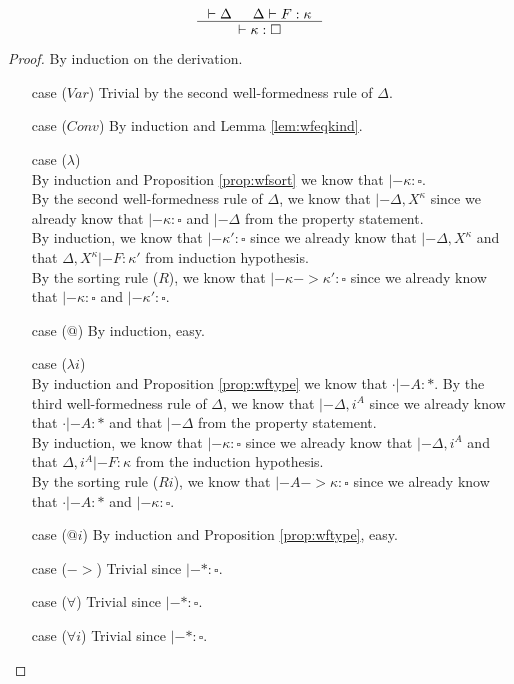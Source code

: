 \begin{proposition}
\label{prop:wfkind}
\[ \inference{ |- \Delta & \Delta |- F : \kappa}{ |- \kappa:\square }
\]
\end{proposition}
\begin{proof} By induction on the derivation.
\begin{itemize}
\item[case] ($Var$)
	Trivial by the second well-formedness rule of $\Delta$.
\item[case] ($Conv$)
	By induction and Lemma \ref{lem:wfeqkind}.
\item[case] ($\lambda$) \\
	By induction and Proposition \ref{prop:wfsort} we know
	that $|- \kappa:\square$.\\
	By the second well-formedness rule of $\Delta$,
	we know that $|- \Delta,X^\kappa$ since we already know
	that $|- \kappa:\square$ and $|- \Delta$ from the property statement.\\
	By induction, we know that $|- \kappa':\square$
	since we already know that $|- \Delta,X^\kappa$ and
	that $\Delta,X^\kappa|- F:\kappa'$ from induction hypothesis.\\
	By the sorting rule ($R$), we know that $|- \kappa -> \kappa':\square$
	since we already know that $|- \kappa:\square$ and $|- \kappa':\square$.
\item[case] ($@$)
	By induction, easy.
\item[case] ($\lambda i$)\\
	By induction and Proposition \ref{prop:wftype} we know
	that $\cdot|- A:*$.
	By the third well-formedness rule of $\Delta$,
	we know that $|- \Delta,i^A$ since we already know that $\cdot|- A:*$ and
	that $|- \Delta$ from the property statement.\\
	By induction, we know that $|- \kappa:\square$
	since we already know that $|- \Delta,i^A$ and
	that $\Delta,i^A|- F:\kappa$ from the induction hypothesis.\\
	By the sorting rule ($Ri$), we know that $|- A -> \kappa:\square$
	since we already know that $\cdot |- A:*$ and $|- \kappa:\square$.
\item[case] ($@i$)
	By induction and Proposition \ref{prop:wftype}, easy.
\item[case] ($->$)
	Trivial since $|- * : \square$.
\item[case] ($\forall$)
	Trivial since $|- * : \square$.
\item[case] ($\forall i$)
	Trivial since $|- * : \square$.
\end{itemize}\vspace*{-10pt}
\end{proof}

